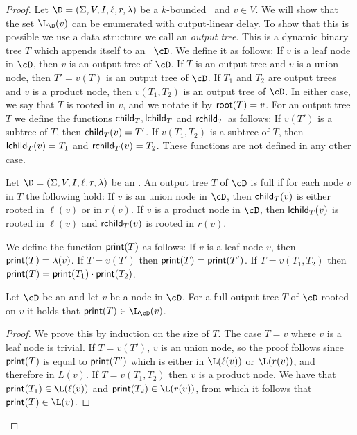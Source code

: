 \begin{proof}	
	Let $\D = (\Sigma, V, I, \ell, r, \lambda)$ be a $k$-bounded \dsabbr\ and $v\in V$. We will show that the set $\L_{\D}(v)$ can be enumerated with output-linear delay. To show that this is possible we use a data structure we call an {\em output tree}. This is a dynamic binary tree $T$ which appends itself to an \dsabbr \ $\cD$. We define it as follows: If $v$ is a leaf node in $\cD$, then $v$ is an output tree of $\cD$. If $T$ is an output tree and $v$ is a union node, then $T' = v(T)$ is an output tree of $\cD$. If $T_1$ and $T_2$ are output trees and $v$ is a product node, then $v(T_1,T_2)$ is an output tree of $\cD$. In either case, we say that $T$ is rooted in $v$, and we notate it by ${\sf root}(T) = v$. For an output tree $T$ we define the functions ${\sf child}_T, {\sf lchild}_T$ and ${\sf rchild}_T$ as follows: If $v(T')$ is a subtree of $T$, then ${\sf child}_T(v) = T'$. If $v(T_1,T_2)$ is a subtree of $T$, then ${\sf lchild}_T(v) = T_1$ and ${\sf rchild}_T(v) = T_2$. These functions are not defined in any other case.
	
	\begin{definition}
		Let $\D = (\Sigma, V, I, \ell, r, \lambda)$ be an \dsabbr. An output tree $T$ of $\cD$ is full if for each node $v$ in $T$ the following hold: If $v$ is an union node in $\cD$, then ${\sf child}_T(v)$ is either rooted in $\ell(v)$ or in $r(v)$. If $v$ is a product node in $\cD$, then ${\sf lchild}_T(v)$ is rooted in $\ell(v)$ and ${\sf rchild}_T(v)$ is rooted in $r(v)$.
	\end{definition}
	
	We define the function ${\sf print}(T)$ as follows: If $v$ is a leaf node $v$, then ${\sf print}(T) = \lambda(v)$. If $T = v(T')$ then ${\sf print}(T) = {\sf print}(T')$. If $T = v(T_1, T_2)$ then ${\sf print}(T) = {\sf print}(T_1)\cdot {\sf print}(T_2)$.
	
	\begin{lemma}\label{appendix:output-tree-print}
		Let $\cD$ be an \dsabbr and let $v$ be a node in $\cD$. For a full output tree $T$ of $\cD$ rooted on $v$ it holds that ${\sf print}(T) \in \L_{\cD}(v)$.
	\end{lemma}
	\begin{proof}
		We prove this by induction on the size of $T$. The case $T = v$ where $v$ is a leaf node is trivial. If $T = v(T')$, $v$ is an union node, so the proof follows since ${\sf print}(T)$ is equal to ${\sf print}(T')$ which is either in $\L(\ell(v))$ or $\L(r(v))$, and therefore in $L(v)$. If $T = v(T_1,T_2)$ then $v$ is a product node. We have that ${\sf print}(T_1)\in\L(\ell(v))$ and ${\sf print}(T_2)\in\L(r(v))$, from which it follows that ${\sf print}(T)\in\L(v)$.
	\end{proof}
	

\end{proof}
